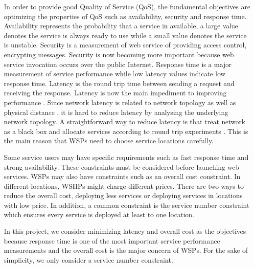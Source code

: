 In order to provide good Quality of Service (QoS), the fundamental objectives are optimizing the properties of QoS such as
availability, security and response time. Availability \cite{Kritikos} represents the probability that a service in available, a large value denotes the service is always ready to use while a small value denotes the service is unstable. Security \cite{Anisetti} is a measurement of web service of providing access control, encrypting messages. Security is now becoming more important because web service invocation occurs over the public Internet.
Response time is a major measurement of service performance while low latency values indicate low response time. Latency
is the round trip time between sending a request and receiving the response.  Latency is now the main impediment to improving performance \cite{Flach}. Since network latency is related to network topology
as well as physical distance \cite{distanceMetrics}, it is hard to reduce latency by analysing the underlying network topology.
A straightforward way to reduce latency is that treat network as a black box and allocate services according to round trip experiments \cite{cha2008design}. 
This is the main reason that WSPs need to choose service locations carefully.

Some service users may have specific requirements such as fast response time and strong availability. These constraints
 must be considered before launching web services. 
 WSPs may also have constraints such as an overall cost constraint. In different locations, 
 WSHPs might charge different prices. There are two ways to reduce the overall cost, deploying less
 services or deploying services in locations with low price.
 In addition, 
 a common constraint is the service number constraint which ensures every service is deployed at least to one location.

In this project, we consider minimizing latency and overall cost as the objectives because response time is one of the most important service performance measurements and the overall cost is the major concern of WSPs. For the sake of simplicity, we
only consider a service number constraint.

